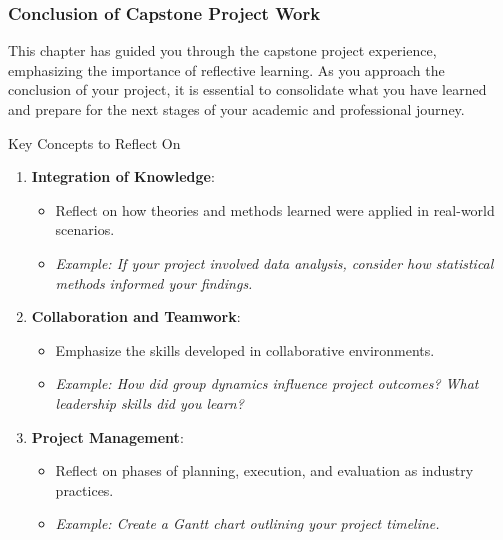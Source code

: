 \documentclass[aspectratio=169]{beamer}
\begin{document}
\begin{frame}[fragile]
    \frametitle{Conclusion of Capstone Project Work}
    
    This chapter has guided you through the capstone project experience, emphasizing the importance of reflective learning. As you approach the conclusion of your project, it is essential to consolidate what you have learned and prepare for the next stages of your academic and professional journey.
    
    \begin{block}{Key Concepts to Reflect On}
        \begin{enumerate}
            \item \textbf{Integration of Knowledge}:
            \begin{itemize}
                \item Reflect on how theories and methods learned were applied in real-world scenarios. 
                \item \textit{Example: If your project involved data analysis, consider how statistical methods informed your findings.}
            \end{itemize}
            
            \item \textbf{Collaboration and Teamwork}:
            \begin{itemize}
                \item Emphasize the skills developed in collaborative environments.
                \item \textit{Example: How did group dynamics influence project outcomes? What leadership skills did you learn?}
            \end{itemize}

            \item \textbf{Project Management}:
            \begin{itemize}
                \item Reflect on phases of planning, execution, and evaluation as industry practices.
                \item \textit{Example: Create a Gantt chart outlining your project timeline.}
            \end{itemize}
        \end{enumerate}
    \end{block}
\end{frame}
\end{document}
